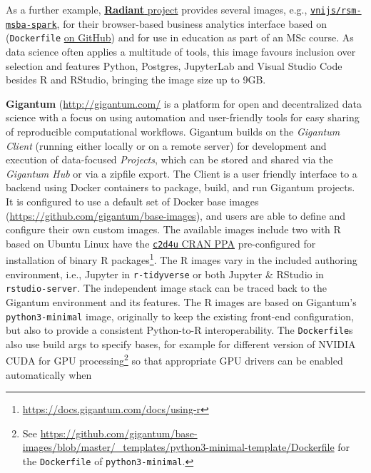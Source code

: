 As a further example,
\href{https://radiant-rstats.github.io/docs/}{\textbf{Radiant} project}
provides several images, e.g.,
\href{https://hub.docker.com/r/vnijs/rsm-msba-spark}{\texttt{vnijs/rsm-msba-spark}},
for their browser-based business analytics interface based on
 (\texttt{Dockerfile}
\href{https://github.com/radiant-rstats/docker}{on GitHub}) and for use
in education as part of an MSc course. As data science often applies a
multitude of tools, this image favours inclusion over selection and
features Python, Postgres, JupyterLab and Visual Studio Code besides R
and RStudio, bringing the image size up to 9GB.

\textbf{Gigantum} (\url{http://gigantum.com/} is a platform for open and
decentralized data science with a focus on using automation and
user-friendly tools for easy sharing of reproducible computational
workflows. Gigantum builds on the \emph{Gigantum Client} (running either
locally or on a remote server) for development and execution of
data-focused \emph{Projects}, which can be stored and shared via the
\emph{Gigantum Hub} or via a zipfile export. The Client is a user
friendly interface to a backend using Docker containers to package,
build, and run Gigantum projects. It is configured to use a default set
of Docker base images (\url{https://github.com/gigantum/base-images}),
and users are able to define and configure their own custom images. The
available images include two with R based on Ubuntu Linux have the
\href{https://launchpad.net/~marutter/+archive/ubuntu/c2d4u3.5/}{\texttt{c2d4u}
CRAN PPA} pre-configured for installation of binary R
packages\footnote{\href{https://docs.gigantum.com/docs/using-r}{https://docs.gigantum.com/docs/using-r}}.
The R images vary in the included authoring environment, i.e., Jupyter
in \texttt{r-tidyverse} or both Jupyter \& RStudio in
\texttt{rstudio-server}. The independent image stack can be traced back
to the Gigantum environment and its features. The R images are based on
Gigantum's \texttt{python3-minimal} image, originally to keep the
existing front-end configuration, but also to provide a consistent
Python-to-R interoperability. The \texttt{Dockerfile}s also use build
args to specify bases, for example for different version of NVIDIA CUDA
for GPU
processing\footnote{See \href{https://github.com/gigantum/base-images/blob/master/_templates/python3-minimal-template/Dockerfile}{https://github.com/gigantum/base-images/blob/master/\_templates/python3-minimal-template/Dockerfile} for the \texttt{Dockerfile} of \texttt{python3-minimal}.}
so that appropriate GPU drivers can be enabled automatically when
